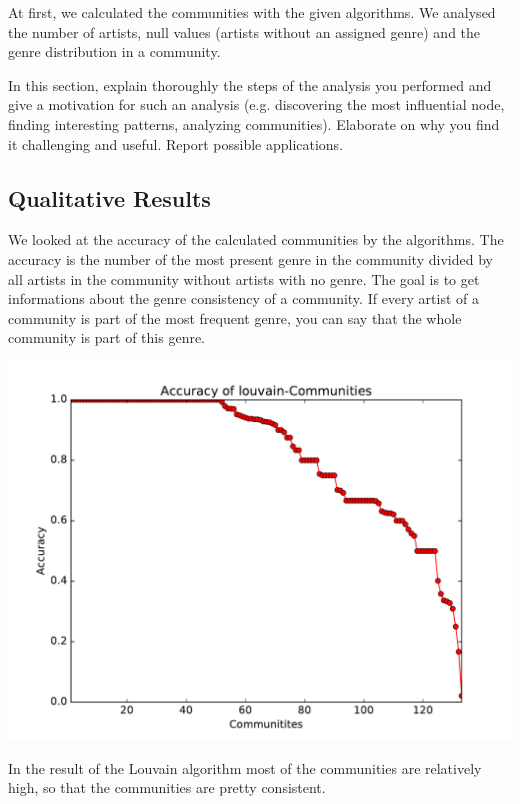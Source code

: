 \documentclass[11pt,a4paper,onecolumn,notitlepage]{article}
\begin{document}
At first, we calculated the communities with the given algorithms. We analysed the number of artists, null values (artists without an assigned genre) and the genre distribution in a community.

In this section, explain thoroughly the steps of the analysis you performed and give a motivation for such an analysis (e.g. discovering the most influential node, finding interesting patterns, analyzing communities). Elaborate on why you find it challenging and useful. Report possible applications.  

\subsection{Qualitative Results}

We looked at the accuracy of the calculated communities by the algorithms. The accuracy is the number of the most present genre in the community divided by all artists in the community without artists with no genre. The goal is to get informations about the genre consistency of a community. If every artist of a community is part of the most frequent genre, you can say that the whole community is part of this genre.

\includegraphics[scale=0.4]{spotify_acc_louvain.pdf}

In the result of the Louvain algorithm most of the communities are relatively high, so that the communities are pretty consistent.
\end{document}
